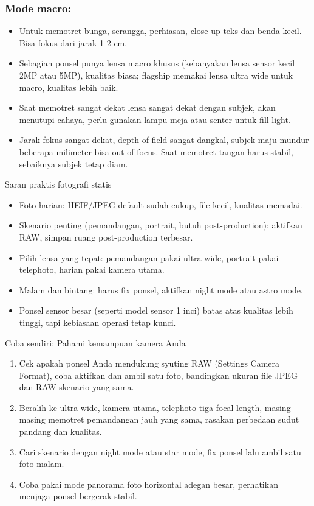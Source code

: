 \subsubsection*{Mode macro:}

\begin{itemize}
  \item Untuk memotret bunga, serangga, perhiasan, close-up teks dan benda kecil. Bisa fokus dari jarak 1-2 cm.
  \item Sebagian ponsel punya lensa macro khusus (kebanyakan lensa sensor kecil 2MP atau 5MP), kualitas biasa; flagship memakai lensa ultra wide untuk macro, kualitas lebih baik.
  \item Saat memotret sangat dekat lensa sangat dekat dengan subjek, akan menutupi cahaya, perlu gunakan lampu meja atau senter untuk fill light.
  \item Jarak fokus sangat dekat, depth of field sangat dangkal, subjek maju-mundur beberapa milimeter bisa out of focus. Saat memotret tangan harus stabil, sebaiknya subjek tetap diam.
\end{itemize}

\begin{tcbinfo}{Saran praktis fotografi statis}
\begin{itemize}
  \item Foto harian: HEIF/JPEG default sudah cukup, file kecil, kualitas memadai.
  \item Skenario penting (pemandangan, portrait, butuh post-production): aktifkan RAW, simpan ruang post-production terbesar.
  \item Pilih lensa yang tepat: pemandangan pakai ultra wide, portrait pakai telephoto, harian pakai kamera utama.
  \item Malam dan bintang: harus fix ponsel, aktifkan night mode atau astro mode.
  \item Ponsel sensor besar (seperti model sensor 1 inci) batas atas kualitas lebih tinggi, tapi kebiasaan operasi tetap kunci.
\end{itemize}

\end{tcbinfo}

\begin{tcbpractice}{Coba sendiri: Pahami kemampuan kamera Anda}
\begin{enumerate}
  \item Cek apakah ponsel Anda mendukung syuting RAW (Settings Camera Format), coba aktifkan dan ambil satu foto, bandingkan ukuran file JPEG dan RAW skenario yang sama.
  \item Beralih ke ultra wide, kamera utama, telephoto tiga focal length, masing-masing memotret pemandangan jauh yang sama, rasakan perbedaan sudut pandang dan kualitas.
  \item Cari skenario dengan night mode atau star mode, fix ponsel lalu ambil satu foto malam.
  \item Coba pakai mode panorama foto horizontal adegan besar, perhatikan menjaga ponsel bergerak stabil.
\end{enumerate}

\end{tcbpractice}
